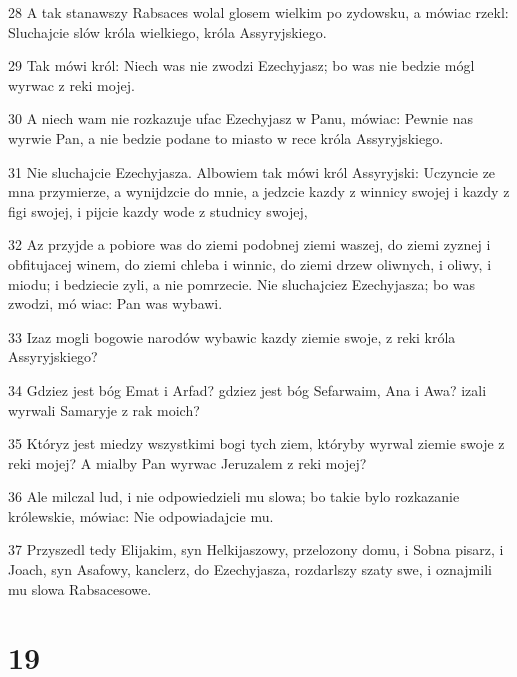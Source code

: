 \par 28 A tak stanawszy Rabsaces wolal glosem wielkim po zydowsku, a mówiac rzekl: Sluchajcie slów króla wielkiego, króla Assyryjskiego.
\par 29 Tak mówi król: Niech was nie zwodzi Ezechyjasz; bo was nie bedzie mógl wyrwac z reki mojej.
\par 30 A niech wam nie rozkazuje ufac Ezechyjasz w Panu, mówiac: Pewnie nas wyrwie Pan, a nie bedzie podane to miasto w rece króla Assyryjskiego.
\par 31 Nie sluchajcie Ezechyjasza. Albowiem tak mówi król Assyryjski: Uczyncie ze mna przymierze, a wynijdzcie do mnie, a jedzcie kazdy z winnicy swojej i kazdy z figi swojej, i pijcie kazdy wode z studnicy swojej,
\par 32 Az przyjde a pobiore was do ziemi podobnej ziemi waszej, do ziemi zyznej i obfitujacej winem, do ziemi chleba i winnic, do ziemi drzew oliwnych, i oliwy, i miodu; i bedziecie zyli, a nie pomrzecie. Nie sluchajciez Ezechyjasza; bo was zwodzi, mó wiac: Pan was wybawi.
\par 33 Izaz mogli bogowie narodów wybawic kazdy ziemie swoje, z reki króla Assyryjskiego?
\par 34 Gdziez jest bóg Emat i Arfad? gdziez jest bóg Sefarwaim, Ana i Awa? izali wyrwali Samaryje z rak moich?
\par 35 Któryz jest miedzy wszystkimi bogi tych ziem, któryby wyrwal ziemie swoje z reki mojej? A mialby Pan wyrwac Jeruzalem z reki mojej?
\par 36 Ale milczal lud, i nie odpowiedzieli mu slowa; bo takie bylo rozkazanie królewskie, mówiac: Nie odpowiadajcie mu.
\par 37 Przyszedl tedy Elijakim, syn Helkijaszowy, przelozony domu, i Sobna pisarz, i Joach, syn Asafowy, kanclerz, do Ezechyjasza, rozdarlszy szaty swe, i oznajmili mu slowa Rabsacesowe.

\chapter{19}

